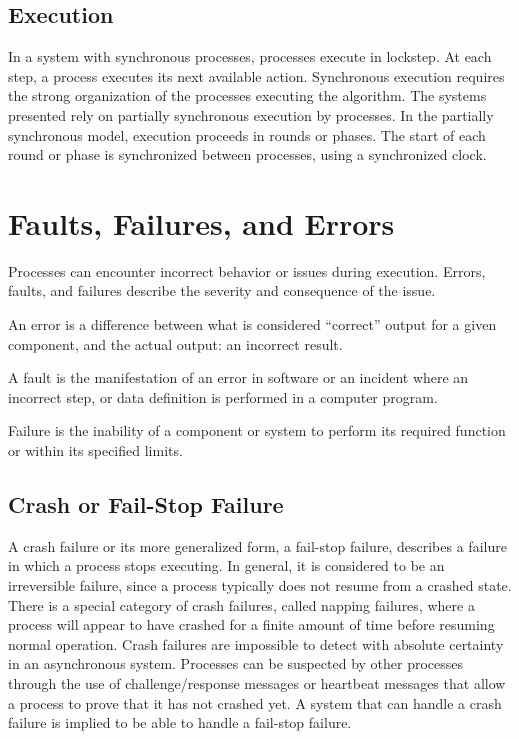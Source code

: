 \subsection{Execution}
In a system with synchronous processes, processes execute in lockstep.
At each step, a process executes its next available action.
Synchronous execution requires the strong organization of the processes executing the algorithm.
The systems presented rely on partially synchronous execution by processes.
In the partially synchronous model, execution proceeds in rounds or phases.
The start of each round or phase is synchronized between processes, using a synchronized clock.

\section{Faults, Failures, and Errors}

Processes can encounter incorrect behavior or issues during execution.
Errors, faults, and failures describe the severity and consequence of the issue.

\begin{pdef}
An error is a difference between what is considered ``correct'' output for a given component, and the actual output: an incorrect result.
\end{pdef}

\begin{pdef}
A fault is the manifestation of an error in software or an incident where an incorrect step, or data definition is performed in a computer program.
\end{pdef}

\begin{pdef}
Failure is the inability of a component or system to perform its required function or within its specified limits.
\end{pdef}

\subsection{Crash or Fail-Stop Failure}

A crash failure or its more generalized form, a fail-stop failure, describes a failure in which a process stops executing.
In general, it is considered to be an irreversible failure, since a process typically does not resume from a crashed state.
There is a special category of crash failures, called napping failures, where a process will appear to have crashed for a finite amount of time before resuming normal operation.
Crash failures are impossible to detect with absolute certainty in an asynchronous system.
Processes can be suspected by other processes through the use of challenge/response messages or heartbeat messages that allow a process to prove that it has not crashed yet.
A system that can handle a crash failure is implied to be able to handle a fail-stop failure.\cite{DISTRIBUTED}

